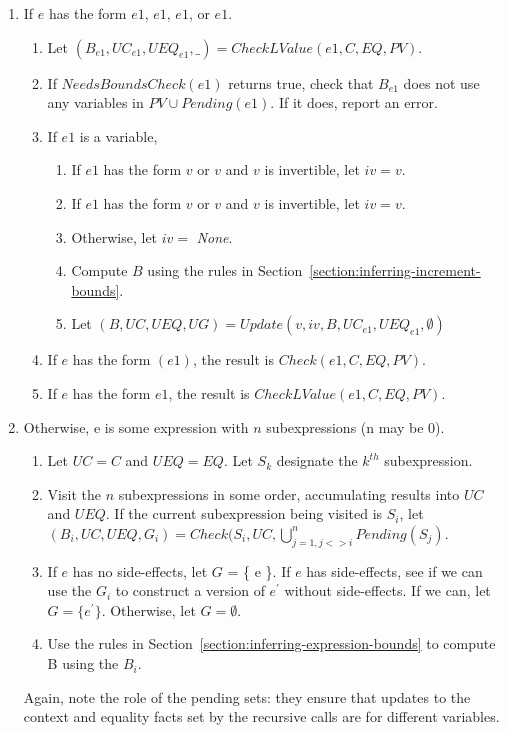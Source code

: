 \begin{enumerate}
\item If $e$ has the form \code{++}$e1$, \code{--}$e1$, $e1$\code{++}, or $e1$\code{--}.
\begin{enumerate}
\item Let $(B_{e1}, {UC}_{e1}, {UEQ}_{e1}, \_) = CheckLValue(e1, C, EQ, PV)$. 
\item If $NeedsBoundsCheck(e1)$ returns true, check that $B_{e1}$ does not use any variables in 
$PV \cup Pending(e1)$.  If it does, report an error.
\item If $e1$ is a variable,
\begin{enumerate}
\item If $e1$ has the form \code{}$v$ or $v$\code{++} and $v$  is invertible, let $iv = v$.
\item If $e1$ has the form \code{--}$v$ or $v$\code{--} and $v$ is invertible, let $iv = v$.
\item Otherwise, let $iv = $ {\em None}.
\item Compute $B$ using the rules in Section~\ref{section:inferring-increment-bounds}.
\item Let $(B, UC, UEQ, UG) = Update(v, iv, B, UC_{e1}, UEQ_{e1}, \emptyset)$
\end{enumerate}

\item If $e$ has the form $(e1)$, the result is $Check(e1, C, EQ, PV)$.

\item If $e$ has the form \code{&}$e1$, the result is $CheckLValue(e1, C, EQ,PV)$.
\end{enumerate}

\item Otherwise, e is some expression with $n$ subexpressions (n may be 0).
\label{list:check-general-operator}
\begin{enumerate}
\item Let $UC = C$ and $UEQ = EQ$.  Let $S_k$ designate the $k^{th}$ subexpression.
\item Visit the $n$ subexpressions in some order, accumulating results into $UC$ and $UEQ$.  If the current subexpression being visited is $S_i$,
let $(B_i, UC, UEQ, G_i) = Check(S_i, UC, \bigcup_{j= 1, j <> i}^{n} Pending(S_j)$.
\item If $e$ has no side-effects, let $G$ = \{ e \}.  If $e$ has side-effects, see if we can use the
$G_i$ to construct a version of $e^\prime$ without side-effects.  If we can,
let $G = \{ e^\prime \}$.  Otherwise, let $G = \emptyset$.
\item Use the rules in Section~\ref{section:inferring-expression-bounds} to compute B using the $B_i$.
\end{enumerate}
Again, note the role of the pending sets: they ensure that updates to the context and
equality facts set by the recursive calls are for different variables.
\end{enumerate}

